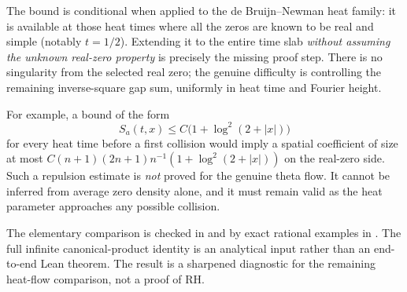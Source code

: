 The bound is conditional when applied to the
de Bruijn--Newman heat family: it is available
at those heat times where all the zeros are
known to be real and simple (notably $t=1/2$).
Extending it to the entire time slab
\emph{without assuming the unknown real-zero
property} is precisely the missing proof step.
There is no singularity from the selected
real zero; the genuine difficulty is controlling
the remaining inverse-square gap sum,
uniformly in heat time and Fourier height.

For example, a bound of the form
\[
S_a(t,x)\le C\bigl(1+\log^2(2+|x|)\bigr)
\]
for every heat time before a first collision
would imply a spatial coefficient of size at
most $C(n+1)(2n+1)n^{-1}
(1+\log^2(2+|x|))$ on the real-zero side.
Such a repulsion estimate is \emph{not} proved
for the genuine theta flow. It cannot be
inferred from average zero density alone,
and it must remain valid as the heat
parameter approaches any possible collision.

The elementary comparison is checked in
 and by
exact rational examples in
.
The full infinite canonical-product identity
is an analytical input rather than an
end-to-end Lean theorem. The result is
a sharpened diagnostic for the remaining
heat-flow comparison, not a proof of RH.
